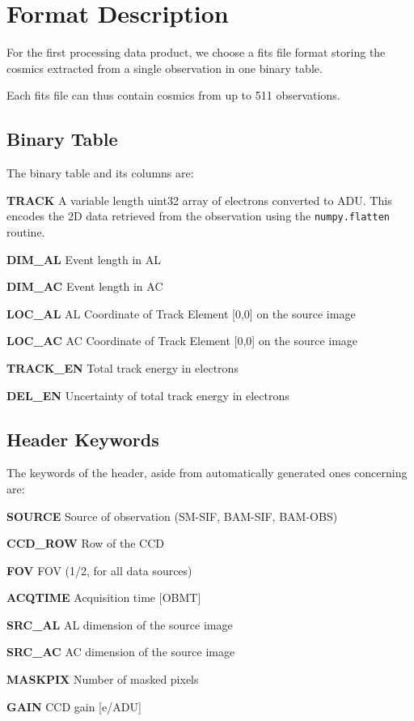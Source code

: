 \documentclass[12pt]{article}
\begin{document}
\section{Format Description}

For the first processing data product, we choose a fits file format storing the cosmics extracted from a single observation in one binary table.

\noindent Each fits file can thus contain cosmics from up to 511 observations.

\subsection{Binary Table}
The binary table and its columns are:


\textbf{TRACK} A variable length uint32 array of electrons converted to ADU. This encodes the 2D data retrieved from the observation using the \texttt{numpy.flatten} routine.

\textbf{DIM\_AL} Event length in AL

\textbf{DIM\_AC} Event length in AC

\textbf{LOC\_AL} AL Coordinate of Track Element [0,0] on the source image

\textbf{LOC\_AC} AC Coordinate of Track Element [0,0] on the source image

\textbf{TRACK\_EN} Total track energy in electrons

\textbf{DEL\_EN} Uncertainty of total track energy in electrons


\subsection{Header Keywords}

\noindent The keywords of the header, aside from automatically generated ones concerning  are:

\textbf{SOURCE} Source of observation (SM-SIF, BAM-SIF, BAM-OBS)

\textbf{CCD\_ROW} Row of the CCD

\textbf{FOV} FOV (1/2, for all data sources)

\textbf{ACQTIME} Acquisition time [OBMT]

\textbf{SRC\_AL} AL dimension of the source image

\textbf{SRC\_AC} AC dimension of the source image

\textbf{MASKPIX} Number of masked pixels

\textbf{GAIN} CCD gain [e/ADU]
\end{document}
